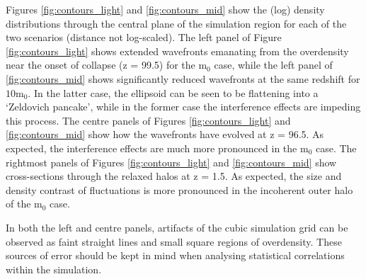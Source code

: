 \documentclass[a4paper,11pt]{article}
\begin{document}
Figures \ref{fig:contours_light} and \ref{fig:contours_mid} show the (log) density distributions through the central plane of the simulation region for each of the two scenarios (distance not log-scaled). The left panel of Figure \ref{fig:contours_light} shows extended wavefronts emanating from the overdensity near the onset of collapse (z = 99.5) for the $\mathrm{m}_0$ case, while the left panel of \ref{fig:contours_mid} shows significantly reduced wavefronts at the same redshift for $10 \mathrm{m}_0$. In the latter case, the ellipsoid can be seen to be flattening into a `Zeldovich pancake', while in the former case the interference effects are impeding this process. The centre panels of Figures \ref{fig:contours_light} and \ref{fig:contours_mid} show how the wavefronts have evolved at z = 96.5. As expected, the interference effects are much more pronounced in the $\mathrm{m}_0$ case. The rightmost panels of Figures \ref{fig:contours_light} and \ref{fig:contours_mid} show cross-sections through the relaxed halos at z = 1.5. As expected, the size and density contrast of fluctuations is more pronounced in the incoherent outer halo of the $\mathrm{m}_0$ case.  

In both the left and centre panels, artifacts of the cubic simulation grid can be observed as faint straight lines and small square regions of overdensity. These sources of error should be kept in mind when analysing statistical correlations within the simulation. 
\end{document}
